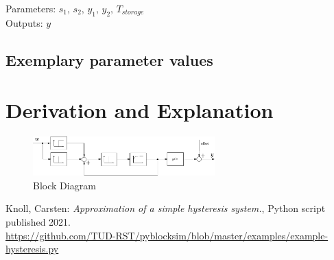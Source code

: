 \documentclass[10pt,a4paper]{article}
\begin{document}
	\noindent
	Parameters: $s_1, \, s_2, \, y_1, \, y_2, \, T_{storage}$%
	\\
	Outputs: $y$ %
	
	
	
	\subsection{Exemplary parameter values}
	

	
	\section{Derivation and Explanation} %
	\begin{figure}[H]
		\centering
		\includegraphics[width=70mm]{hysteresis.pdf}
		\caption{Block Diagram}
	\end{figure}
	
	
	
	\begin{thebibliography}{10}		
		Knoll, Carsten: 
		\textit{Approximation of a simple hysteresis system.}, Python script published 2021. \\
		\url{https://github.com/TUD-RST/pyblocksim/blob/master/examples/example-hysteresis.py}
	\end{thebibliography}
\end{document}
